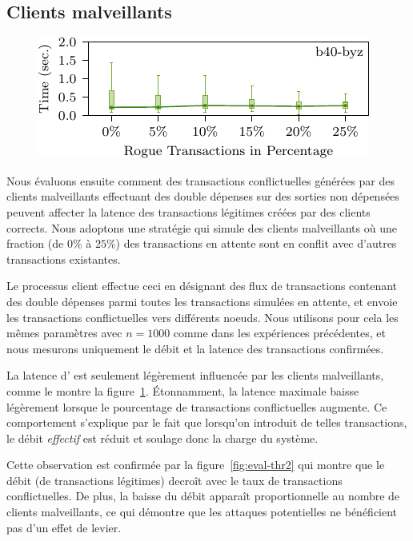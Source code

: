 \subsection{Clients malveillants}
\label{sec:evaluation-misbehaving}
\begin{figure}
\includegraphics[width=\linewidth]{figures/lat3.pdf}
\label{fig:eval-lat3}
\end{figure}

Nous évaluons ensuite comment des transactions conflictuelles générées par des clients malveillants effectuant des
double dépenses sur des sorties non dépensées peuvent affecter la latence des transactions légitimes créées par
des clients corrects. Nous adoptons une stratégie qui simule des clients malveillants où une fraction (de $0\%$ à $25\%$)
des transactions en attente sont en conflit avec d'autres transactions existantes.

Le processus client effectue ceci en désignant des flux de transactions contenant des double dépenses parmi toutes
les transactions simulées en attente, et envoie les transactions conflictuelles vers différents noeuds. Nous utilisons
pour cela les mêmes paramètres avec $n = 1000$ comme dans les expériences précédentes, et nous mesurons uniquement
le débit et la latence des transactions confirmées.

La latence d'{\sysname} est seulement légèrement influencée par les clients malveillants, comme le montre la
figure~\ref{fig:eval-lat3}. Étonnamment, la latence maximale baisse légèrement lorsque le pourcentage de transactions
conflictuelles augmente. Ce comportement s'explique par le fait que lorsqu'on introduit de telles transactions, le débit
\emph{effectif} est réduit et soulage donc la charge du système.

Cette observation est confirmée par la figure~\ref{fig:eval-thr2} qui montre que le débit (de transactions légitimes)
decroît avec le taux de transactions conflictuelles. De plus, la baisse du débit apparaît proportionnelle au nombre de
clients malveillants, ce qui démontre que les attaques potentielles ne bénéficient pas d'un effet de levier.

